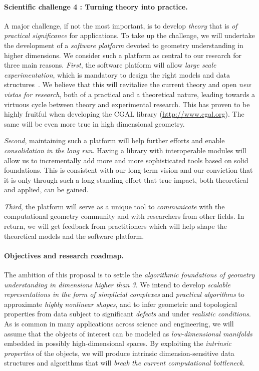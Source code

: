 \paragraph{Scientific challenge 4 : Turning theory into practice.}
A major challenge, if not the most important, is to develop {\em theory} that is {\em of practical significance} for applications.  To take up the challenge, we will %
undertake the development of a {\em software platform} devoted to geometry understanding in higher dimensions.  We consider such a platform as central to our research for three main reasons.  {\em First}, the software platform will allow {\em large scale experimentation}, which is mandatory to design the right models and data structures~\cite{bm-dssc-2012}. We believe that this will revitalize the current theory and open {\em new vistas for research}, both of a practical and a theoretical nature, leading towards a virtuous cycle between theory and experimental research. This has proven to be highly fruitful when developing the CGAL library (\url{http://www.cgal.org}{}). The same will be even more true in high dimensional geometry.

{\em Second}, maintaining such a platform will help further efforts
and enable {\em consolidation in the long run}.  Having a library with interoperable modules will allow us to incrementally add more and more sophisticated tools based on solid foundations.  This is consistent with our long-term vision and our conviction that it is only through such a long standing effort that true impact, both theoretical and applied, can be gained.

{\em Third}, the platform will serve as a unique tool to {\em communicate} with the computational geometry community and with researchers from other fields. 
 In return, we will get feedback from practitioners which will help shape the theoretical models and the software platform.
\vspace{-3mm} 

\paragraph{Objectives and research roadmap.}
The ambition of this proposal is to settle the {\em algorithmic
foundations of geometry understanding in dimensions higher than
3}.  We intend to develop {\em scalable representations in the form of simplicial complexes} and {\em
practical algorithms} to approximate {\em highly nonlinear shapes}, and to
infer geometric and topological properties from data subject to
significant {\em defects} and under {\em realistic conditions}.
As is common in many applications across science and engineering, we
will assume that the objects of interest can be modeled as {\em
  low-dimensional manifolds} embedded in possibly high-dimensional
spaces. By exploiting the {\em intrinsic properties} of the objects,
we will produce intrinsic dimension-sensitive data structures and algorithms
that will {\em break the current computational
bottleneck.}  %

